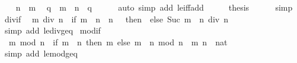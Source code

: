 \begin{isabellebody}
\ \ \isamarkupfalse%
\ {\isacartoucheopen}n\ {\isasymle}\ m{\isacartoucheclose}\ \isamarkupfalse%
\ q\ \ {\isachardoublequoteopen}m\ {\isacharequal}{\kern0pt}\ n\ {\isacharplus}{\kern0pt}\ q{\isachardoublequoteclose}\isanewline
\ \ \ \ \isamarkupfalse%
\ {\isacharparenleft}{\kern0pt}auto\ simp\ add{\isacharcolon}{\kern0pt}\ le{\isacharunderscore}{\kern0pt}iff{\isacharunderscore}{\kern0pt}add{\isacharparenright}{\kern0pt}\isanewline
\ \ \isamarkupfalse%
\ \isamarkupfalse%
\ {\isacharquery}{\kern0pt}thesis\isanewline
\ \ \ \ \isamarkupfalse%
\ simp\isanewline
{}\isamarkupfalse%
%
\endisatagproof
{\isafoldproof}%
%
\isadelimproof
\isanewline
%
\endisadelimproof
\isanewline
{}\isamarkupfalse%
\ div{\isacharunderscore}{\kern0pt}if{\isacharcolon}{\kern0pt}\isanewline
\ \ {\isachardoublequoteopen}m\ div\ n\ {\isacharequal}{\kern0pt}\ {\isacharparenleft}{\kern0pt}if\ m\ {\isacharless}{\kern0pt}\ n\ {\isasymor}\ n\ {\isacharequal}{\kern0pt}\ {}\ then\ {}\ else\ Suc\ {\isacharparenleft}{\kern0pt}{\isacharparenleft}{\kern0pt}m\ {\isacharminus}{\kern0pt}\ n{\isacharparenright}{\kern0pt}\ div\ n{\isacharparenright}{\kern0pt}{\isacharparenright}{\kern0pt}{\isachardoublequoteclose}\isanewline
%
\isadelimproof
\ \ %
\endisadelimproof
%
\isatagproof
{}\isamarkupfalse%
\ {\isacharparenleft}{\kern0pt}simp\ add{\isacharcolon}{\kern0pt}\ le{\isacharunderscore}{\kern0pt}div{\isacharunderscore}{\kern0pt}geq{\isacharparenright}{\kern0pt}%
\endisatagproof
{\isafoldproof}%
%
\isadelimproof
\isanewline
%
\endisadelimproof
\isanewline
{}\isamarkupfalse%
\ mod{\isacharunderscore}{\kern0pt}if{\isacharcolon}{\kern0pt}\isanewline
\ \ {\isachardoublequoteopen}m\ mod\ n\ {\isacharequal}{\kern0pt}\ {\isacharparenleft}{\kern0pt}if\ m\ {\isacharless}{\kern0pt}\ n\ then\ m\ else\ {\isacharparenleft}{\kern0pt}m\ {\isacharminus}{\kern0pt}\ n{\isacharparenright}{\kern0pt}\ mod\ n{\isacharparenright}{\kern0pt}{\isachardoublequoteclose}\ \ m\ n\ {\isacharcolon}{\kern0pt}{\isacharcolon}{\kern0pt}\ nat\isanewline
%
\isadelimproof
\ \ %
\endisadelimproof
%
\isatagproof
{}\isamarkupfalse%
\ {\isacharparenleft}{\kern0pt}simp\ add{\isacharcolon}{\kern0pt}\ le{\isacharunderscore}{\kern0pt}mod{\isacharunderscore}{\kern0pt}geq{\isacharparenright}{\kern0pt}%
\endisatagproof
{\isafoldproof}%
%
\isadelimproof
\isanewline
%
\endisadelimproof
\isanewline
{}\isamarkupfalse%

\end{isabellebody}
